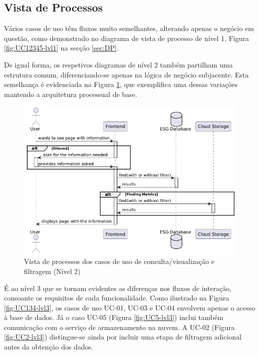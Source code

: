 \subsection{Vista de Processos}
\label{subsec:process_view}

Vários casos de uso têm fluxos muito semelhantes, alterando apenas o negócio em questão, como demonstrado no diagrama de vista de processo de nível 1, Figura \ref{fig:UC12345-lvl1} na secção \ref{sec:DP}.

De igual forma, os respetivos diagramas de nível 2 também partilham uma estrutura comum, diferenciando-se apenas na lógica de negócio subjacente. Esta semelhança é evidenciada na Figura \ref{fig:UC12345-lvl2}, que exemplifica uma dessas variações mantendo a arquitetura processual de base.

\begin{figure}[H]
\centering
\includegraphics[width=5in]{frontmatter/assets/diagrams/Process Views/UC12345-lvl2.png}
\caption{Vista de processos dos casos de uso de consulta/visualização e filtragem (Nível 2)}
\label{fig:UC12345-lvl2}
\end{figure}

É ao nível 3 que se tornam evidentes as diferenças nos fluxos de interação, consoante os requisitos de cada funcionalidade. Como ilustrado na Figura \ref{fig:UC134-lvl3}, os casos de uso UC-01, UC-03 e UC-04 envolvem apenas o acesso à base de dados. Já o caso UC-05 (Figura \ref{fig:UC5-lvl3}) inclui também comunicação com o serviço de armazenamento na nuvem. A UC-02 (Figura \ref{fig:UC2-lvl3}) distingue-se ainda por incluir uma etapa de filtragem adicional antes da obtenção dos dados.


